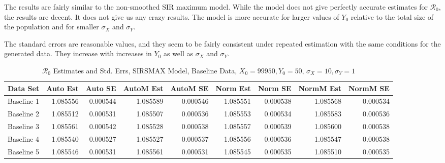 \documentclass[12pt]{article}
\newcommand{\rr}{\ensuremath{\mathcal{R}_0}}
\begin{document}
The results are fairly similar to the non-smoothed SIR maximum model.  While the model does not give perfectly accurate estimates for $\rr$, the results are decent. It does not give us any crazy results. The model is more accurate for larger values of $Y_0$ relative to the total size of the population and for smaller $\sigma_X$ and $\sigma_Y$.

The standard errors are reasonable values, and they seem to be fairly consistent under repeated estimation with the same conditions for the generated data.  They increase with increases in $Y_0$ as well as $\sigma_X$ and $\sigma_Y$.

\begin{table}[H]
	
	\caption{$\rr$ Estimates and Std. Errs, SIRSMAX Model,
		Baseline Data, $X_0 = 99950, Y_0 = 50$, 
		$\sigma_X = 10, \sigma_Y = 1$}
	\begin{footnotesize}
		\hskip -1cm
		\begin{tabular}{l|r|r|r|r|r|r|r|r}
			\hline
			Data Set & Auto Est & Auto SE & AutoM Est & AutoM SE & Norm Est & Norm SE & NormM Est & NormM SE\\
			\hline
			Baseline 1 & 1.085556 & 0.000544 & 1.085589 & 0.000546 & 1.085551 & 0.000538 & 1.085568 & 0.000534\\
			\hline
			Baseline 2 & 1.085512 & 0.000531 & 1.085507 & 0.000536 & 1.085553 & 0.000534 & 1.085583 & 0.000536\\
			\hline
			Baseline 3 & 1.085561 & 0.000542 & 1.085528 & 0.000538 & 1.085557 & 0.000539 & 1.085600 & 0.000538\\
			\hline
			Baseline 4 & 1.085540 & 0.000527 & 1.085527 & 0.000537 & 1.085556 & 0.000536 & 1.085547 & 0.000538\\
			\hline
			Baseline 5 & 1.085546 & 0.000531 & 1.085561 & 0.000531 & 1.085545 & 0.000535 & 1.085510 & 0.000535\\
			\hline
		\end{tabular}
	\end{footnotesize}
\end{table}
\end{document}
